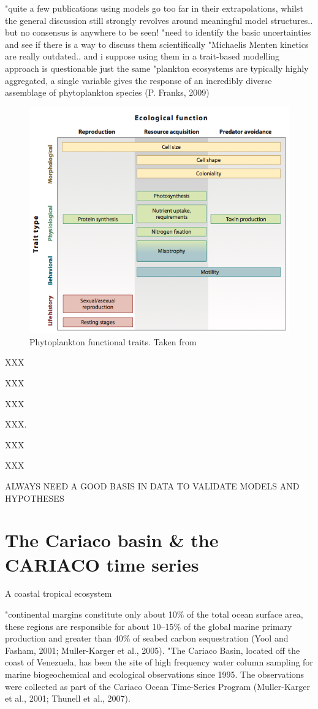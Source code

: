 "quite a few publications using models go too far in their extrapolations, whilst the general discussion still strongly revolves around meaningful model structures.. but no consensus is anywhere to be seen!
"need to identify the basic uncertainties and see if there is a way to discuss them scientifically
"Michaelis Menten kinetics are really outdated.. and i suppose using them in a trait-based modelling approach is questionable just the same
"plankton ecosystems are typically highly aggregated, a single variable gives the response of an incredibly diverse assemblage of phytoplankton species (P. Franks, 2009)


\begin{figure}
\centering
\includegraphics[width=0.7\linewidth]{./Chp1-Intro/Fig_litchman2008.png}
\caption[Scheme]{\small{Phytoplankton functional traits. Taken from \citet{Litchman2008}}}
\label{phytotrait}
\end{figure}

XXX

XXX

XXX

XXX. 

XXX

XXX

ALWAYS NEED A GOOD BASIS IN DATA TO VALIDATE MODELS AND HYPOTHESES

\section{The Cariaco basin \& the CARIACO time series}

A coastal tropical ecosystem

"continental margins constitute only about 10\% of the total ocean surface area, these regions are responsible for about 10–15\% of the global marine primary production and greater than 40\% of seabed carbon sequestration (Yool and Fasham, 2001; Muller-Karger et al., 2005). 
"The Cariaco Basin, located off the coast of Venezuela, has been the site of high frequency water column sampling for marine biogeochemical and ecological observations since 1995. The observations were collected as part of the Cariaco Ocean Time-Series Program (Muller-Karger et al., 2001; Thunell et al., 2007). 

